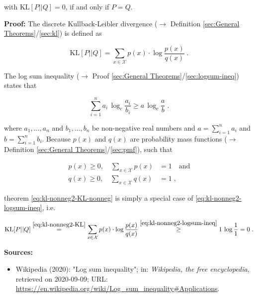 \documentclass[a4paper,12pt,twoside]{book}
\begin{document}
with $\mathrm{KL}[P \vert \vert Q] = 0$, if and only if $P = Q$.


\vspace{1em}
\textbf{Proof:} The discrete Kullback-Leibler divergence ($\rightarrow$ Definition \ref{sec:General Theorems}/\ref{sec:kl}) is defined as

\begin{equation} \label{eq:kl-nonneg2-KL}
\mathrm{KL}[P||Q] = \sum_{x \in \mathcal{X}} p(x) \cdot \log \frac{p(x)}{q(x)} \; .
\end{equation}

The log sum inequality ($\rightarrow$ Proof \ref{sec:General Theorems}/\ref{sec:logsum-ineq}) states that

\begin{equation} \label{eq:kl-nonneg2-logsum-ineq}
\sum_{i=1}^n a_i \, \log_c \frac{a_i}{b_i} \geq a \, \log_c \frac{a}{b} \; .
\end{equation}

where $a_1, \ldots, a_n$ and $b_1, \ldots, b_n$ be non-negative real numbers and $a = \sum_{i=1}^{n} a_i$ and $b = \sum_{i=1}^{n} b_i$. Because $p(x)$ and $q(x)$ are probability mass functions ($\rightarrow$ Definition \ref{sec:General Theorems}/\ref{sec:pmf}), such that

\begin{equation} \label{eq:kl-nonneg2-p-q-pmf}
\begin{split}
p(x) \geq 0, \quad \sum_{x \in \mathcal{X}} p(x) &= 1 \quad \text{and} \\
q(x) \geq 0, \quad \sum_{x \in \mathcal{X}} q(x) &= 1 \; ,
\end{split}
\end{equation}

theorem \eqref{eq:kl-nonneg2-KL-nonneg} is simply a special case of \eqref{eq:kl-nonneg2-logsum-ineq}, i.e.

\begin{equation} \label{eq:kl-nonneg2-KL-nonneg-qed}
\mathrm{KL}[P||Q] \overset{\eqref{eq:kl-nonneg2-KL}}{=} \sum_{x \in \mathcal{X}} p(x) \cdot \log \frac{p(x)}{q(x)} \overset{\eqref{eq:kl-nonneg2-logsum-ineq}}{\geq} 1 \, \log \frac{1}{1} = 0 \; .
\end{equation}


\vspace{1em}
\textbf{Sources:}
\begin{itemize}
\item Wikipedia (2020): "Log sum inequality"; in: \textit{Wikipedia, the free encyclopedia}, retrieved on 2020-09-09; URL: \url{https://en.wikipedia.org/wiki/Log_sum_inequality#Applications}.
\end{itemize}
\end{document}
